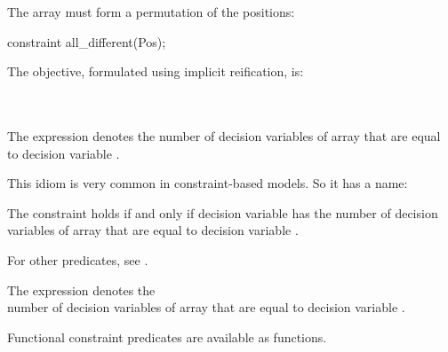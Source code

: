 \documentclass{cons-beamer}
\begin{document}
\begin{flashcardminizinc}
\begin{frame}[fragile]
\begin{example}
    The array  must form a permutation of the
    positions:
    \begin{mznno}
constraint all_different(Pos);
    \end{mznno}\vfill
    The objective, formulated using implicit reification, is: \\[+3pt]
     \\
    ~~~~\mzninline{(}\texttt{~}
  \end{example}
\end{frame}

\begin{frame}[fragile]
  \begin{example}
    The expression 
    denotes  the number of decision variables of array
     that are equal to decision variable .
  \end{example}
  This idiom is very common in constraint-based models.  So it has a
  name: \vfill
  \begin{definition}
    The constraint  holds if and only if
    decision variable  has the number of decision
    variables of array  that are equal to decision
    variable .
  \end{definition}
  For other predicates, see \topicConsPredicates. \vfill
  \begin{definition}
    The expression  denotes the \\ number of
    decision variables of array  that are equal to
    decision variable .
  \end{definition}
  \begin{example}
    \footnotesize
  \end{example}
  Functional constraint predicates are available as functions.
\end{frame}


\end{flashcardminizinc}
\end{document}
